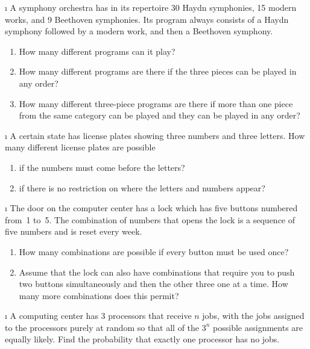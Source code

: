 \begin{LJSItem}
\i\label{exer 3.1.12} A symphony orchestra has in its repertoire 30 Haydn
symphonies, 15 modern works, and 9 Beethoven symphonies.  Its program always consists
of a Haydn symphony followed by a modern work, and then a Beethoven symphony.

\begin{enumerate}
\item How many different programs can it play?

\item How many different programs are there if the three pieces can be played in
any order?

\item How many different three-piece programs are there if more than one piece from
the same category can be played and they can be played in any order?
\end{enumerate}

\i\label{exer 3.1.13} A certain state has license plates showing three numbers and
three letters.  How many different license plates are possible

\begin{enumerate}
\item if the numbers must come before the letters?

\item if there is no restriction on where the letters and numbers appear?
\end{enumerate}

\i\label{exer 3.1.14} The door on the computer center has a lock which has five
buttons numbered from~1 to~5.  The combination of numbers that opens the lock is a
sequence of five numbers and is reset every week.

\begin{enumerate}
\item How many combinations are possible if every button must be used once?

\item Assume that the lock can also have combinations that require you to push two
buttons simultaneously and then the other three one at a time.  How many more
combinations does this permit?
\end{enumerate}

\i\label{exer 3.1.15} A computing center has 3 processors that receive $n$ jobs,
with the jobs assigned to the processors purely at random so that all of the $3^n$ 
possible assignments are equally likely.  Find the probability that exactly one
processor has no jobs.


\end{LJSItem}
